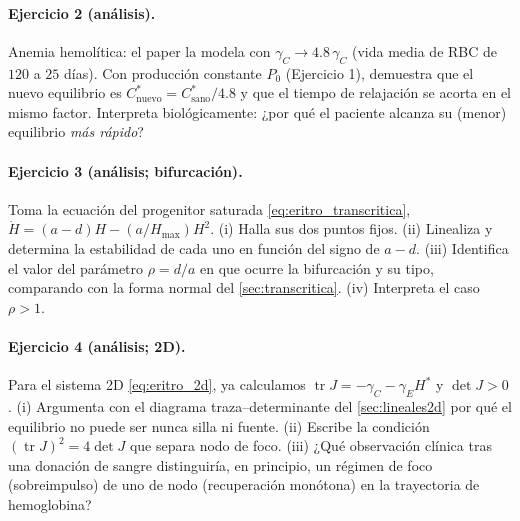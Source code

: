 \paragraph{Ejercicio 2 (análisis).} Anemia hemolítica: el paper la modela con $\gamma_C \to 4.8\,\gamma_C$ (vida media de RBC de $120$ a $25$ días). Con producción constante $P_0$ (Ejercicio 1), demuestra que el nuevo equilibrio es $C^*_{\text{nuevo}} = C^*_{\text{sano}}/4.8$ y que el tiempo de relajación se acorta en el mismo factor. Interpreta biológicamente: ¿por qué el paciente alcanza su (menor) equilibrio \emph{más rápido}?

\paragraph{Ejercicio 3 (análisis; bifurcación).} Toma la ecuación del progenitor saturada \eqref{eq:eritro_transcritica}, $\dot H = (a-d)H - (a/H_{\max})H^2$. (i) Halla sus dos puntos fijos. (ii) Linealiza y determina la estabilidad de cada uno en función del signo de $a-d$. (iii) Identifica el valor del parámetro $\rho=d/a$ en que ocurre la bifurcación y su tipo, comparando con la forma normal del \cref{sec:transcritica}. (iv) Interpreta el caso $\rho>1$.

\paragraph{Ejercicio 4 (análisis; 2D).} Para el sistema 2D \eqref{eq:eritro_2d}, ya calculamos $\operatorname{tr}J = -\gamma_C-\gamma_E H^*$ y $\det J>0$. (i) Argumenta con el diagrama traza--determinante del \cref{sec:lineales2d} por qué el equilibrio no puede ser nunca silla ni fuente. (ii) Escribe la condición $(\operatorname{tr}J)^2 = 4\det J$ que separa nodo de foco. (iii) ¿Qué observación clínica tras una donación de sangre distinguiría, en principio, un régimen de foco (sobreimpulso) de uno de nodo (recuperación monótona) en la trayectoria de hemoglobina?

